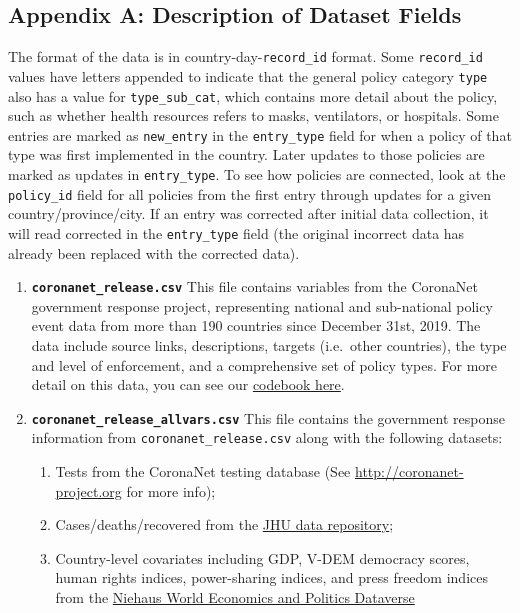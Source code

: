\documentclass[]{article}
\providecommand{\tightlist}{%
  \setlength{\itemsep}{0pt}\setlength{\parskip}{0pt}}
\begin{document}
\hypertarget{appendix-a-description-of-dataset-fields}{%
\subsection*{Appendix A: Description of Dataset Fields}\label{appendix-a-description-of-dataset-fields}}

The format of the data is in country-day-\texttt{record\_id} format. Some \texttt{record\_id} values have letters appended to indicate that the general policy category \texttt{type} also has a value for \texttt{type\_sub\_cat}, which contains more detail about the policy, such as whether health resources refers to masks, ventilators, or hospitals. Some entries are marked as \texttt{new\_entry} in the \texttt{entry\_type} field for when a policy of that type was first implemented in the country. Later updates to those policies are marked as updates in \texttt{entry\_type}. To see how policies are connected, look at the \texttt{policy\_id} field for all policies from the first entry through updates for a given country/province/city. If an entry was corrected after initial data collection, it will read corrected in the \texttt{entry\_type} field (the original incorrect data has already been replaced with the corrected data).

\begin{enumerate}
\def\labelenumi{\arabic{enumi}.}
\item
  \textbf{\texttt{coronanet\_release.csv}} This file contains variables from the CoronaNet government response project, representing national and sub-national policy event data from more than 190 countries since December 31st, 2019. The data include source links, descriptions, targets (i.e.~other countries), the type and level of enforcement, and a comprehensive set of policy types. For more detail on this data, you can see our \href{https://docs.google.com/document/d/1zvNMpwj0onFvUZ_gLl4RRjqS-clbHv3TIX6EOHofsME}{codebook here}.
\item
  \textbf{\texttt{coronanet\_release\_allvars.csv}} This file contains the government response information from \texttt{coronanet\_release.csv} along with the following datasets:

  \begin{enumerate}
  \def\labelenumii{\alph{enumii}.}
  \tightlist
  \item
    Tests from the CoronaNet testing database (See \url{http://coronanet-project.org} for more info);
  \item
    Cases/deaths/recovered from the \href{https://github.com/CSSEGISandData/COVID-19}{JHU data repository};
  \item
    Country-level covariates including GDP, V-DEM democracy scores, human rights indices, power-sharing indices, and press freedom indices from the \href{https://niehaus.princeton.edu/news/world-economics-and-politics-dataverse}{Niehaus World Economics and Politics Dataverse}
  \end{enumerate}
\end{enumerate}
\end{document}
